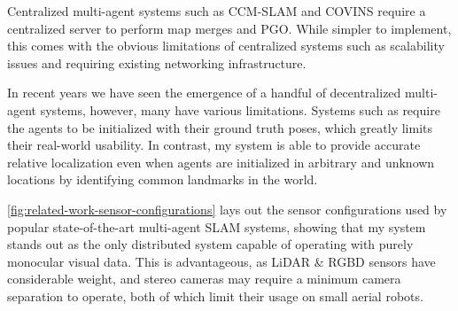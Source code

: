 Centralized multi-agent systems such as CCM-SLAM \autocite{schmuck2019ccm} and COVINS \autocite{schmuck2021covins} require a centralized server to perform map merges and PGO. While simpler to implement, this comes with the obvious limitations of centralized systems such as scalability issues and requiring existing networking infrastructure.

In recent years we have seen the emergence of a handful of decentralized multi-agent systems, however, many have various limitations. Systems such as \autocite{doi:10.1126/scirobotics.abm5954} \autocite{8658783} \autocite{DBLP:journals/corr/abs-2103-12770} require the agents to be initialized with their ground truth poses, which greatly limits their real-world usability. In contrast, my system is able to provide accurate relative localization even when agents are initialized in arbitrary and unknown locations by identifying common landmarks in the world.

\autoref{fig:related-work-sensor-configurations} lays out the sensor configurations used by popular state-of-the-art multi-agent SLAM systems, showing that my system stands out as the only distributed system capable of operating with purely monocular visual data. This is advantageous, as LiDAR \& RGBD sensors have considerable weight, and stereo cameras may require a minimum camera separation to operate, both of which limit their usage on small aerial robots.

